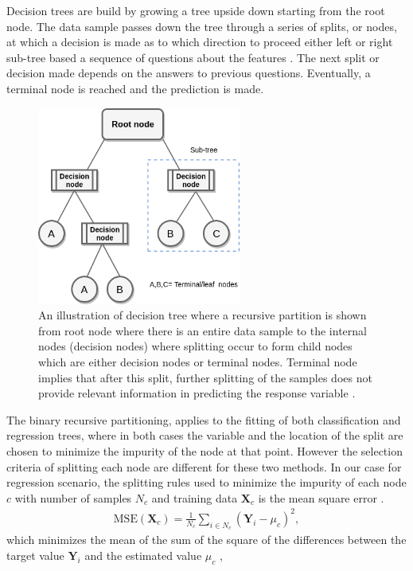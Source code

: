 Decision trees are build by growing a tree upside down starting from the root node. The data sample passes down the tree through a series of splits, or nodes, at which a decision is made as to which direction to proceed either left or right sub-tree based a sequence of questions about the features \citep{musicant2007supervised}. The next split or decision made depends on the answers to previous questions. Eventually, a terminal node is reached and the prediction is made.  

 \begin{figure}[H]
  \centering
    \includegraphics[width=0.6\textwidth]{images/DC.png}
    \caption{An illustration of decision tree where a recursive partition is shown from root node where there is an entire data sample to the internal nodes (decision nodes) where splitting occur to form child nodes which are either decision nodes or terminal nodes. Terminal node implies that after this split, further splitting of the samples does not provide relevant information in predicting the response variable \citep{moisen2008classification}. }
  \label{images/DecisionTree}
\end{figure}

The binary recursive partitioning, applies to the fitting of both classification and regression trees, where in both cases the variable and the location of the split are
chosen to minimize the impurity of the node at that point. However the selection criteria of splitting each node are different for these two methods. In our case for regression scenario, the splitting rules used to minimize the impurity of each node $c$ with number of samples $N_{c}$ and training data $\textbf{X}_{c}$ is the mean square error \citep{morgan2014classification}.
\begin{align}
\text{MSE}\left(\textbf{X}_{c}\right)=\frac{1}{N_{c}} \sum_{i\in N_{c}} (\textbf{Y}_{i}-\mu_{c})^2,
\end{align}  
which minimizes the mean of the sum of the square of the differences between the target value $\textbf{Y}_{i}$ and the estimated value $\mu_{c}$ \citep{moisen2008classification},
 
